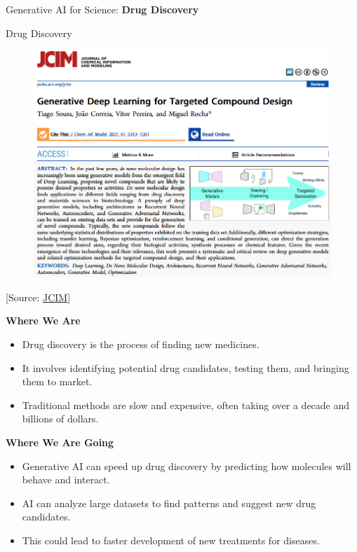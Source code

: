 \begin{frame}{}
    \LARGE Generative AI for Science: \textbf{Drug Discovery}
\end{frame}

\begin{frame}[allowframebreaks]{Drug Discovery}
    \begin{figure}
        \centering
        \includegraphics[height=0.8\textheight,width=1\textwidth,keepaspectratio]{images/science/drug-discovery-paper.png}
    \end{figure}
    [Source: \href{https://pubs.acs.org/doi/epdf/10.1021/acs.jcim.0c01496?ref=article_openPDF}{JCIM}]

    \framebreak

    \textbf{Where We Are}
    \begin{itemize}
        \item Drug discovery is the process of finding new medicines.
        \item It involves identifying potential drug candidates, testing them, and bringing them to market.
        \item Traditional methods are slow and expensive, often taking over a decade and billions of dollars.
    \end{itemize}

    \framebreak

    \textbf{Where We Are Going}
    \begin{itemize}
        \item Generative AI can speed up drug discovery by predicting how molecules will behave and interact.
        \item AI can analyze large datasets to find patterns and suggest new drug candidates.
        \item This could lead to faster development of new treatments for diseases.
    \end{itemize}


\end{frame}

